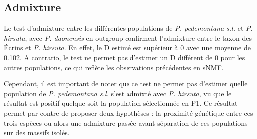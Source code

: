 \subsection{Admixture}

Le test d'admixture entre les différentes populations de \textit{P. pedemontana s.l.} et \textit{P. hirsuta}, avec \textit{P. daonensis} en outgroup confirment l'admixture entre le taxon des Écrins et \textit{P. hirsuta}. En effet, le D estimé est supérieur à 0 avec une moyenne de 0.102. A contrario, le test ne permet pas d'estimer un D différent de 0 pour les autres populations, ce qui reflète les observations précédentes en sNMF.

Cependant, il est important de noter que ce test ne permet pas d'estimer quelle population de \textit{P. pedemontana s.l.} s'est admixté avec \textit{P. hirsuta}, vu que le résultat est positif quelque soit la population sélectionnée en P1. Ce résultat permet par contre de proposer deux hypothèses : la proximité génétique entre ces trois espèces ou alors une admixture passée avant séparation de ces populations sur des massifs isolés.




